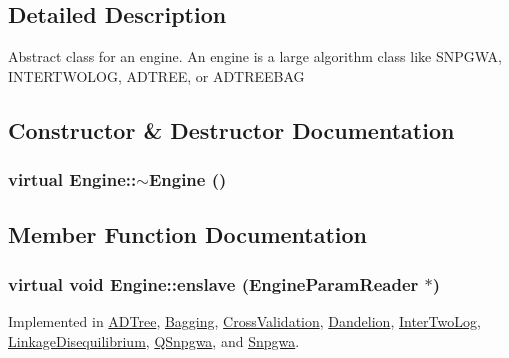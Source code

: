 \subsection{Detailed Description}
Abstract class for an engine. An engine is a large algorithm class like SNPGWA, INTERTWOLOG, ADTREE, or ADTREEBAG 

\subsection{Constructor \& Destructor Documentation}
\hypertarget{classEngine_a41f2d854040e17d9c4d7b324a4bfbf39}{
\subsubsection[{$\sim$Engine}]{\setlength{\rightskip}{0pt plus 5cm}virtual Engine::$\sim$Engine ()}}
\label{classEngine_a41f2d854040e17d9c4d7b324a4bfbf39}


\subsection{Member Function Documentation}
\hypertarget{classEngine_a023e094182312b1732fe53754c2fe5cb}{
\subsubsection[{enslave}]{\setlength{\rightskip}{0pt plus 5cm}virtual void Engine::enslave ({\bf EngineParamReader} $\ast$)}}
\label{classEngine_a023e094182312b1732fe53754c2fe5cb}


Implemented in \hyperlink{classADTree_a4e89d611e7dc79fa8826efa742f9ce42}{ADTree}, \hyperlink{classBagging_aa1f58fca264385a46fa7c14a5620488c}{Bagging}, \hyperlink{classCrossValidation_a50b65a606c324404de92f44dba655154}{CrossValidation}, \hyperlink{classDandelion_ac95a20aaaff8170c4539e047cb7a551a}{Dandelion}, \hyperlink{classInterTwoLog_aa96d91206c19b781d222f0d6e13bf51d}{InterTwoLog}, \hyperlink{classLinkageDisequilibrium_afb777d3a63bbb0f2d23ce052de891023}{LinkageDisequilibrium}, \hyperlink{classQSnpgwa_a2c39271b1001005e6d5a451dbc2fd8bb}{QSnpgwa}, and \hyperlink{classSnpgwa_a976e974bf71743c194a9c098cefff04c}{Snpgwa}.

